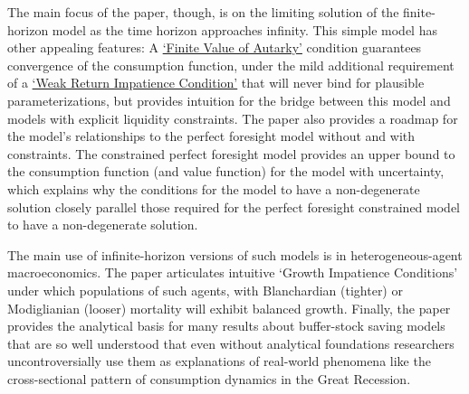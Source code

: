 \documentclass[BufferStockTheory]{subfiles}
\begin{document}
The main focus of the paper, though, is on the limiting solution of the finite-horizon model as the time horizon approaches infinity.
This simple model has other appealing features: A \hyperlink{FVAC}{`Finite Value of Autarky'} condition guarantees convergence of the consumption function, under the mild additional requirement of a \hyperlink{WRIC}{`Weak Return Impatience Condition'} that will never bind for plausible parameterizations, but provides intuition for the bridge between this model and models with explicit liquidity constraints.
The paper also provides a roadmap for the model's relationships to the perfect foresight model without and with constraints.
The constrained perfect foresight model provides an upper bound to the consumption function (and value function) for the model with uncertainty, which explains why the conditions for the model to have a non-degenerate solution closely parallel those required for the perfect foresight constrained model to have a non-degenerate solution.

The main use of infinite-horizon versions of such models is in heterogeneous-agent macroeconomics.
The paper articulates intuitive `Growth Impatience Conditions' under which populations of such agents, with Blanchardian (tighter) or Modiglianian (looser) mortality will exhibit balanced growth.
Finally, the paper provides the analytical basis for many results about buffer-stock saving models that are so well understood that even without analytical foundations researchers uncontroversially use them as explanations of real-world phenomena like the cross-sectional pattern of consumption dynamics in the Great Recession.































\ifSubfilesClassLoaded{\bibfilesfind{\texname}}{}
\end{document}
